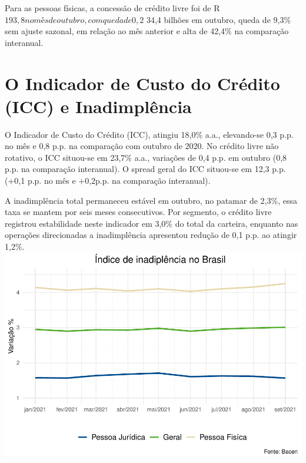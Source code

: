 \documentclass[100,a4paperpaper,]{article}
\begin{document}
Para as pessoas físicas, a concessão de crédito livre foi de
R\(193,8 no mês de outubro, com queda de 0,2%
\) 34,4 bilhões em outubro, queda de 9,3\% sem ajuste sazonal, em
relação ao mês anterior e alta de 42,4\% na comparação interanual.
\newpage

\section{O Indicador de Custo do Crédito (ICC) e Inadimplência} 
 \vspace{0,20cm}

O Indicador de Custo do Crédito (ICC), atingiu 18,0\% a.a., elevando-se
0,3 p.p. no mês e 0,8 p.p. na comparação com outubro de 2020. No crédito
livre não rotativo, o ICC situou-se em 23,7\% a.a., variações de 0,4
p.p. em outubro (0,8 p.p. na comparação interanual). O spread geral do
ICC situou-se em 12,3 p.p. (+0,1 p.p. no mês e +0,2p.p. na comparação
interanual).

A inadimplência total permaneceu estável em outubro, no patamar de
2,3\%, essa taxa se mantem por seis meses consecutivos. Por segmento, o
crédito livre registrou estabilidade neste indicador em 3,0\% do total
da carteira, enquanto nas operações direcionadas a inadimplência
apresentou redução de 0,1 p.p. ao atingir 1,2\%.
\includegraphics{credito_files/figure-latex/inadiplencia-1.pdf}
\end{document}
